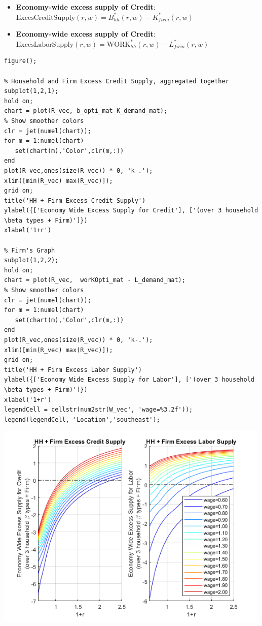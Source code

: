 \documentclass[
]{book}
\begin{document}
\begin{itemize}
\item
  \textbf{Economy-wide excess supply of Credit}:
  \(\textrm{ExcesCreditSupply}(r,w)=B_{hh}^* (r,w)-K_{firm}^* (r,w)\)
\item
  \textbf{Economy-wide excess supply of Credit}:
  \(\textrm{ExcesLaborSupply}(r,w)={\textrm{WORK}}_{hh}^* (r,w)-L_{firm}^* (r,w)\)
\end{itemize}

\begin{verbatim}
figure();

% Household and Firm Excess Credit Supply, aggregated together
subplot(1,2,1);
hold on;
chart = plot(R_vec, b_opti_mat-K_demand_mat);
% Show smoother colors
clr = jet(numel(chart));
for m = 1:numel(chart)
   set(chart(m),'Color',clr(m,:))
end
plot(R_vec,ones(size(R_vec)) * 0, 'k-.');
xlim([min(R_vec) max(R_vec)]);
grid on;
title('HH + Firm Excess Credit Supply')
ylabel({['Economy Wide Excess Supply for Credit'], ['(over 3 household \beta types + Firm)']})
xlabel('1+r')

% Firm's Graph
subplot(1,2,2);
hold on;
chart = plot(R_vec,  worKOpti_mat - L_demand_mat);
% Show smoother colors
clr = jet(numel(chart));
for m = 1:numel(chart)
   set(chart(m),'Color',clr(m,:))
end
plot(R_vec,ones(size(R_vec)) * 0, 'k-.');
xlim([min(R_vec) max(R_vec)]);
grid on;
title('HH + Firm Excess Labor Supply')
ylabel({['Economy Wide Excess Supply for Labor'], ['(over 3 household \beta types + Firm)']})
xlabel('1+r')
legendCell = cellstr(num2str(W_vec', 'wage=%3.2f'));
legend(legendCell, 'Location','southeast');
\end{verbatim}

\includegraphics[width=5.20833in,height=\textheight]{img/equilibrium_constrainedborrow_labor_images/figure_2.png}
\end{document}
